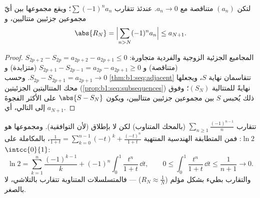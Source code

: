 \begin{theorem}\label{thm:b1:series:alternating}
لتكن $(a_n)$ متناقصة مع $a_n \to 0$. عندئذ تتقارب  $\sum (-1)^n a_n$؛ ويقع مجموعها بين أيّ مجموعين جزئيين
متتاليين، و
\[
\abs{R_N} = \Bigl| \sum_{n > N} (-1)^n a_n \Bigr| \leq a_{N+1} .
\]
\end{theorem}

\begin{proof}
المجاميع الجزئية الزوجية والفردية متجاورة: $S_{2p+2} - S_{2p} =
a_{2p+2} - a_{2p+1} \leq 0$ (متناقصة) و $S_{2p+1} - S_{2p-1} =
a_{2p} - a_{2p+1} \geq 0$ (متزايدة) و $S_{2p} - S_{2p+1} =
a_{2p+1} \to 0$. وحسب \cref{thm:b1:seq:adjacent} تتقاسمان نهاية
$S$، ويجعلها محك المتتاليتين الجزئيتين
(\cref{prop:b1:seq:subsequences}) نهايةً للمتتالية $(S_N)$؛
وفوق ذلك يُحبس $S$ بين مجموعين جزئيين متتاليين، ويكون
$\abs{S - S_N}$ على الأكثر الفجوةَ إلى التالي، أي $a_{N+1}$.
\end{proof}

\begin{example}\label{ex:b1:series:ln2}
تتقارب $\sum_{n \geq 1} \frac{(-1)^{n-1}}{n}$ (بالمحك المتناوب)
لكن لا بإطلاق (لأن  التوافقية). ومجموعها هو $\ln 2$: فمن
المتطابقة الهندسية المنتهية $\frac{1}{1+t} = \sum_{k=0}^{n-1} (-t)^k +
\frac{(-t)^n}{1+t}$، بالمكاملة على $\intcc{0}{1}$:
\[
\ln 2 = \sum_{k=1}^{n} \frac{(-1)^{k-1}}{k}
+ (-1)^n \int_0^1 \frac{t^n}{1+t}\,\dd t ,
\qquad
0 \leq \int_0^1 \frac{t^n}{1+t}\,\dd t \leq \frac{1}{n+1} \to 0 .
\]
والتقارب بطيء بشكل مؤلم ($R_N \approx \frac{1}{N}$) ---
فالمتسلسلات المتناوبة تتقارب بالتلاشي، لا بالصغر.
\end{example}

